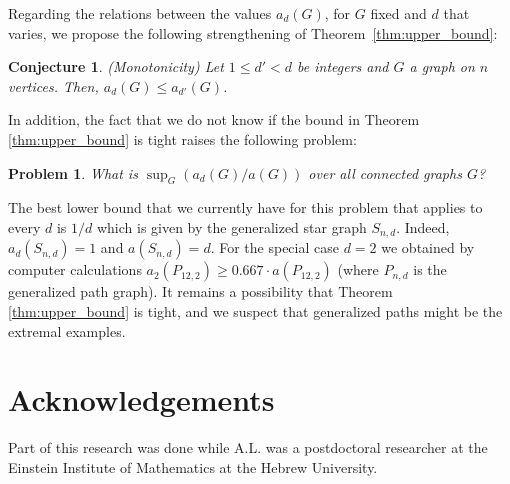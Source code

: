\documentclass[a4paper,11pt]{article}
\theoremstyle{plain}
\newtheorem{problem}[theorem]{\bf Problem}
\newtheorem{conjecture}[theorem]{\bf Conjecture}
\theoremstyle{definition}
\begin{document}
Regarding the relations between the values $a_d(G)$, for $G$ fixed and $d$ that varies, we propose the following strengthening of Theorem~\ref{thm:upper_bound}:

\begin{conjecture}(Monotonicity)
Let $1\le d'<d$ be integers and $G$ a graph on $n$ vertices. Then,
$a_d(G) \le a_{d'}(G)$.
\end{conjecture}


In addition, the fact that we do not know if the bound in Theorem \ref{thm:upper_bound} is tight raises the following problem:
\begin{problem}
    What is $\sup_G (a_d(G) / a(G))$ over all connected graphs $G$?
\end{problem}
The best lower bound that we currently have for this problem that applies to every $d$ is $1/d$ which is given by the generalized star graph $S_{n,d}$. Indeed,  $a_d(S_{n,d})=1$ and $a(S_{n,d})=d$.
For the special case $d=2$ we obtained by computer calculations $a_2(P_{12,2})\geq 0.667\cdot a(P_{12,2})$ (where $P_{n,d}$ is the generalized path graph). It remains a possibility that Theorem \ref{thm:upper_bound} is tight, and we suspect that generalized paths might be the extremal examples. 






\section*{Acknowledgements}
Part of this research was done while A.L. was a postdoctoral researcher at the Einstein Institute of Mathematics at the Hebrew University.






\end{document}
